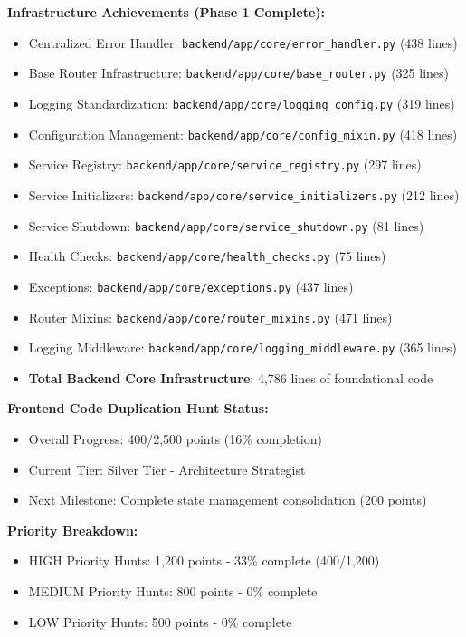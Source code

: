 \documentclass[10pt]{article}
\begin{document}
\textbf{Infrastructure Achievements (Phase 1 Complete):}
\begin{itemize}
    \item Centralized Error Handler: \texttt{backend/app/core/error\_handler.py} (438 lines)
    \item Base Router Infrastructure: \texttt{backend/app/core/base\_router.py} (325 lines)
    \item Logging Standardization: \texttt{backend/app/core/logging\_config.py} (319 lines)
    \item Configuration Management: \texttt{backend/app/core/config\_mixin.py} (418 lines)
    \item Service Registry: \texttt{backend/app/core/service\_registry.py} (297 lines)
    \item Service Initializers: \texttt{backend/app/core/service\_initializers.py} (212 lines)
    \item Service Shutdown: \texttt{backend/app/core/service\_shutdown.py} (81 lines)
    \item Health Checks: \texttt{backend/app/core/health\_checks.py} (75 lines)
    \item Exceptions: \texttt{backend/app/core/exceptions.py} (437 lines)
    \item Router Mixins: \texttt{backend/app/core/router\_mixins.py} (471 lines)
    \item Logging Middleware: \texttt{backend/app/core/logging\_middleware.py} (365 lines)
    \item \textbf{Total Backend Core Infrastructure}: 4,786 lines of foundational code
\end{itemize}

\textbf{Frontend Code Duplication Hunt Status:}
\begin{itemize}
    \item Overall Progress: 400/2,500 points (16\% completion)
    \item Current Tier: Silver Tier - Architecture Strategist
    \item Next Milestone: Complete state management consolidation (200 points)
\end{itemize}

\textbf{Priority Breakdown:}
\begin{itemize}
    \item HIGH Priority Hunts: 1,200 points - 33\% complete (400/1,200)
    \item MEDIUM Priority Hunts: 800 points - 0\% complete
    \item LOW Priority Hunts: 500 points - 0\% complete
\end{itemize}
\end{document}
